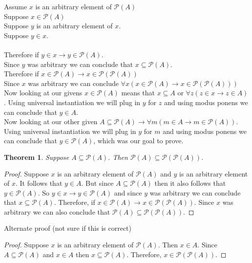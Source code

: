 \documentclass{article}
\newcommand{\n}{ \noindent }
\newcommand{\pwset}{\mathscr{P}}
\newtheorem*{theorem}{Theorem}  %
\begin{document}
\n Assume $x$ is an arbitrary element of $\pwset(A)$ \\
\indent Suppose $x \in \pwset(A)$ \\
\indent \indent Suppose $y$ is an arbitrary element of $x$. \\
\indent \indent \indent Suppose $y \in x$. \\
\indent \indent \indent \indent[ proof of $y \in \pwset(A)$ ] \\
\indent \indent \indent Therefore if $y \in x \rightarrow y \in \pwset(A)$.\\
\indent \indent Since $y$ was arbitrary we can conclude that $x \subseteq \pwset(A)$. \\
\indent Therefore if $x \in \pwset(A) \rightarrow x \in \pwset(\pwset(A))$ \\
\n Since $x$ was arbitrary we can conclude $\forall x(x \in \pwset(A) \rightarrow x \in \pwset(\pwset(A)))$ \\

\n Now looking at our givens $x \in \pwset(A)$ means that $x \subseteq A$ or $\forall z(z \in x \rightarrow z \in A)$. Using universal instantiation we will plug in $y$ for $z$ and using modus ponens we can conclude that $y \in A$. \\

\n Now looking at our other given $A \subseteq \pwset(A) \rightarrow \forall m(m \in A \rightarrow m \in \pwset(A))$. Using universal instantiation we will plug in $y$ for $m$ and using modus ponens we can conclude that $y \in \pwset(A)$, which was our goal to prove.

\begin{theorem} Suppose $A \subseteq \pwset(A)$. Then $\pwset(A) \subseteq \pwset(\pwset(A))$.
\end{theorem}
\begin{proof}
Suppose $x$ is an arbitrary element of $\pwset(A)$ and $y$ is an arbitrary element of $x$. It follows that $y \in A$. But since $A \subseteq \pwset(A)$ then it also follows that $y \in \pwset(A)$. So $y \in x \rightarrow y \in \pwset(A)$ and since $y$ was arbitrary we can conclude that $x \subseteq \pwset(A)$. Therefore, if $x \in \pwset(A) \rightarrow x \in \pwset(\pwset(A))$. Since $x$ was arbitrary we can also conclude that $\pwset(A) \subseteq \pwset(\pwset(A))$.
\end{proof}

\n Alternate proof (not sure if this is correct)

\begin{proof}
Suppose $x$ is an arbitrary element of $\pwset(A)$. Then $x \in A$. Since $A \subseteq \pwset(A)$ and $x \in A$ then $x \subseteq \pwset(A)$. Therefore, $x \in \pwset(\pwset(A))$.
\end{proof}
\end{document}

